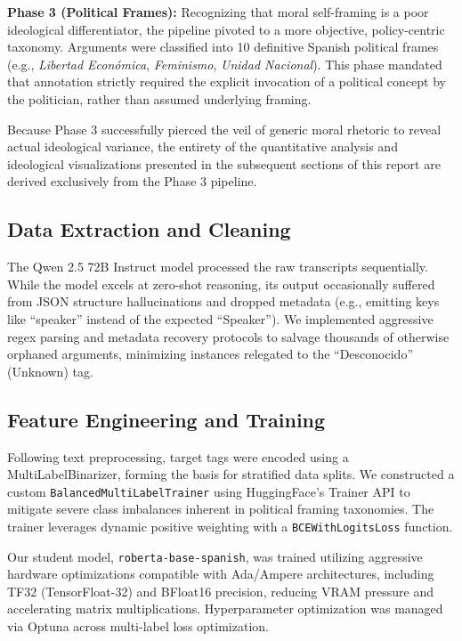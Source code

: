 \documentclass[11pt,a4paper]{article}
\begin{document}
\textbf{Phase 3 (Political Frames):} Recognizing that moral self-framing is a poor ideological differentiator, the pipeline pivoted to a more objective, policy-centric taxonomy. Arguments were classified into 10 definitive Spanish political frames (e.g., \textit{Libertad Económica}, \textit{Feminismo}, \textit{Unidad Nacional}). This phase mandated that annotation strictly required the explicit invocation of a political concept by the politician, rather than assumed underlying framing. 

Because Phase 3 successfully pierced the veil of generic moral rhetoric to reveal actual ideological variance, the entirety of the quantitative analysis and ideological visualizations presented in the subsequent sections of this report are derived exclusively from the Phase 3 pipeline.

\subsection{Data Extraction and Cleaning}
The Qwen 2.5 72B Instruct model processed the raw transcripts sequentially. While the model excels at zero-shot reasoning, its output occasionally suffered from JSON structure hallucinations and dropped metadata (e.g., emitting keys like ``speaker'' instead of the expected ``Speaker''). We implemented aggressive regex parsing and metadata recovery protocols to salvage thousands of otherwise orphaned arguments, minimizing instances relegated to the ``Desconocido'' (Unknown) tag.

\subsection{Feature Engineering and Training}
Following text preprocessing, target tags were encoded using a MultiLabelBinarizer, forming the basis for stratified data splits. We constructed a custom \texttt{BalancedMultiLabelTrainer} using HuggingFace's Trainer API to mitigate severe class imbalances inherent in political framing taxonomies. The trainer leverages dynamic positive weighting with a \texttt{BCEWithLogitsLoss} function.

Our student model, \texttt{roberta-base-spanish}, was trained utilizing aggressive hardware optimizations compatible with Ada/Ampere architectures, including TF32 (TensorFloat-32) and BFloat16 precision, reducing VRAM pressure and accelerating matrix multiplications. Hyperparameter optimization was managed via Optuna across multi-label loss optimization.
\end{document}
